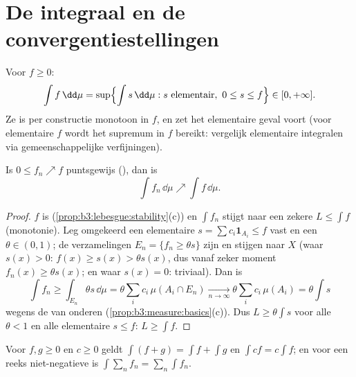 \section{De integraal en de convergentiestellingen}

\begin{definition}\label{def:b3:lebesgue:integral}
Voor  $f \geq 0$:
\[
\int f \,\dd\mu = \sup\Bigl\{\int s\,\dd\mu : s \text{
elementair},\ 0 \leq s \leq f\Bigr\} \in [0, +\infty].
\]
Ze is per constructie monotoon in $f$, en zet het elementaire
geval voort (voor elementaire $f$ wordt het supremum in $f$
bereikt: vergelijk elementaire integralen via gemeenschappelijke
verfijningen).
\end{definition}

\begin{theorem}
\label{thm:b3:lebesgue:mct}
Is $0 \leq f_n \nearrow f$ puntsgewijs (), dan is
\[
\int f_n\,\dd\mu \nearrow \int f\,\dd\mu .
\]
\end{theorem}

\begin{proof}
$f$ is  (\cref{prop:b3:lebesgue:stability}(c)) en $\int
f_n$ stijgt naar een zekere $L \leq \int f$ (monotonie). Leg
omgekeerd een elementaire $s = \sum c_i\mathbf 1_{A_i} \leq f$
vast en een $\theta \in (0,1)$; de verzamelingen $E_n = \{f_n \geq
\theta s\}$ zijn  en stijgen naar $X$ (waar $s(x) > 0$:
$f(x) \geq s(x) > \theta s(x)$, dus vanaf zeker moment $f_n(x)
\geq \theta s(x)$; en waar $s(x) = 0$: triviaal). Dan is
\[
\int f_n \geq \int_{E_n}\theta s\,\dd\mu
= \theta\sum_i c_i\,\mu(A_i \cap E_n)
\xrightarrow[n\to\infty]{} \theta\sum_ic_i\,\mu(A_i)
= \theta\int s
\]
wegens de  van onderen
(\cref{prop:b3:measure:basics}(c)). Dus $L \geq \theta\int s$ voor
alle $\theta < 1$ en alle elementaire $s \leq f$: $L \geq \int f$.
\end{proof}

\begin{corollary}\label{cor:b3:lebesgue:additivity}
Voor  $f, g \geq 0$ en $c \geq 0$ geldt $\int(f + g) =
\int f + \int g$ en $\int cf = c\int f$; en voor een reeks
niet-negatieve  is $\int\sum_nf_n =
\sum_n\int f_n$.
\end{corollary}

